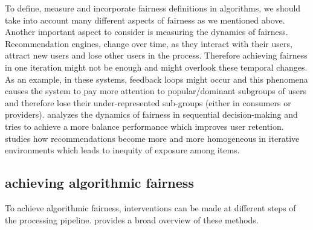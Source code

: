     To define, measure and incorporate fairness definitions in algorithms, we should take into account many different aspects of fairness as we mentioned above. Another important aspect to consider is measuring the dynamics of fairness. Recommendation engines, change over time, as they interact with their users, attract new users and lose other users in the process. Therefore achieving fairness in one iteration might not be enough and might overlook these temporal changes.
    As an example, in these systems, feedback loops might occur and this phenomena causes the system to pay more attention to popular/dominant subgroups of users \cite{hashimoto2018fairness} and therefore lose their under-represented sub-groups (either in consumers or providers). \cite{zhang2019group} analyzes the dynamics of fairness in sequential decision-making and tries to achieve a more balance performance which improves user retention. \cite{Chaney2018} studies how recommendations become more and more homogeneous in iterative environments which leads to inequity of exposure among items. 
    


\subsection{achieving algorithmic fairness}
To achieve algorithmic fairness, interventions can be made at different steps of the processing pipeline. \cite{Friedler2019} provides a broad overview of these methods.

